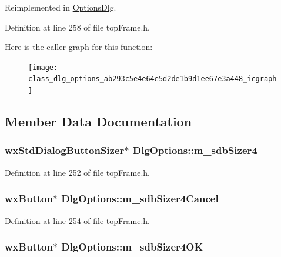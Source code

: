 Reimplemented in \hyperlink{class_options_dlg_a955c09ba654830aae49fa44221fe92a9}{Options\-Dlg}.



Definition at line 258 of file top\-Frame.\-h.



Here is the caller graph for this function\-:
\nopagebreak
\begin{figure}[H]
\begin{center}
\leavevmode
\texttt{[image: class\_dlg\_options\_ab293c5e4e64e5d2de1b9d1ee67e3a448\_icgraph]}
\end{center}
\end{figure}




\subsection{Member Data Documentation}
\hypertarget{class_dlg_options_ab71c6ceea19ba3ba907aa7d1d3a5a63d}{
\subsubsection[{m\-\_\-sdb\-Sizer4}]{\setlength{\rightskip}{0pt plus 5cm}wx\-Std\-Dialog\-Button\-Sizer$\ast$ Dlg\-Options\-::m\-\_\-sdb\-Sizer4\hspace{0.3cm}{\ttfamily [protected]}}}\label{class_dlg_options_ab71c6ceea19ba3ba907aa7d1d3a5a63d}


Definition at line 252 of file top\-Frame.\-h.

\hypertarget{class_dlg_options_ae99c4b9abc19085e47108d6f8db704c6}{
\subsubsection[{m\-\_\-sdb\-Sizer4\-Cancel}]{\setlength{\rightskip}{0pt plus 5cm}wx\-Button$\ast$ Dlg\-Options\-::m\-\_\-sdb\-Sizer4\-Cancel\hspace{0.3cm}{\ttfamily [protected]}}}\label{class_dlg_options_ae99c4b9abc19085e47108d6f8db704c6}


Definition at line 254 of file top\-Frame.\-h.

\hypertarget{class_dlg_options_a7d0b24d52fdb25871dc30640f1027a51}{
\subsubsection[{m\-\_\-sdb\-Sizer4\-O\-K}]{\setlength{\rightskip}{0pt plus 5cm}wx\-Button$\ast$ Dlg\-Options\-::m\-\_\-sdb\-Sizer4\-O\-K\hspace{0.3cm}{\ttfamily [protected]}}}\label{class_dlg_options_a7d0b24d52fdb25871dc30640f1027a51}


